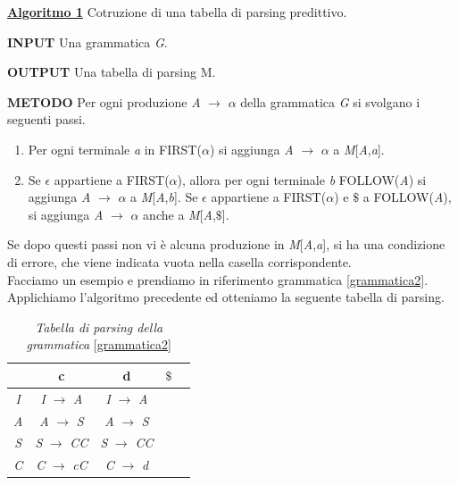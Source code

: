 \textbf{\underline{Algoritmo 1}} Cotruzione di una tabella di parsing predittivo.\par 
\vspace{0.2cm}\textbf{INPUT} Una grammatica \textit{G}.\par
\textbf{OUTPUT} Una tabella di parsing M.\par 
\textbf{METODO} Per ogni produzione \textit{A} $\to$ $\alpha$ della grammatica \textit{G} si svolgano i seguenti passi.
\begin{enumerate}
	\item Per ogni terminale \textit{a} in FIRST($\alpha$) si aggiunga \textit{A} $\to$ $\alpha$ a \textit{M}[\textit{A},\textit{a}].
	\item Se $\epsilon$ appartiene a FIRST($\alpha$), allora per ogni terminale \textit{b} FOLLOW(\textit{A}) si aggiunga \textit{A} $\to$ $\alpha$ a \textit{M}[\textit{A},\textit{b}]. Se $\epsilon$ appartiene a FIRST($\alpha$) e $\$$ a FOLLOW(\textit{A}), si aggiunga \textit{A} $\to$ $\alpha$ anche a \textit{M}[\textit{A},$\$$].
\end{enumerate}
Se dopo questi passi non vi è alcuna produzione in \textit{M}[\textit{A},\textit{a}], si ha una condizione di errore, che viene indicata vuota nella casella corrispondente.\\ 
Facciamo un esempio e prendiamo in riferimento grammatica \ref{grammatica2}. Applichiamo l'algoritmo precedente ed otteniamo la seguente tabella di parsing.
\begin{table}[hbpb]
	\centering
	\label{tabellaparsing}
	\begin{tabular}{ccccc} %
		\toprule
		& c & d & $\$$ \\ 
		\midrule
		\textit{I}			& \textit{I} $\to$ \textit{A}  & \textit{I} $\to$ \textit{A} &    \\ 
		\textit{A} 			& \textit{A} $\to$ \textit{S}  & \textit{A} $\to$ \textit{S} &    \\ 
		\textit{S}			& \textit{S} $\to$ \textit{CC} & \textit{S} $\to$ \textit{CC} &   \\ 
		\textit{C} 			& \textit{C} $\to$ \textit{cC}& \textit{C} $\to$ \textit{d} &     \\ 
		\bottomrule
	\end{tabular}
	\caption{\textit{Tabella di parsing della grammatica }\ref{grammatica2}}
\end{table} \par

